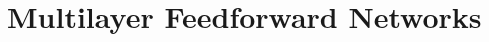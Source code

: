 \documentclass[../main.tex]{subfiles}
\begin{document}
	\chapter{Multilayer Feedforward Networks} \label{ch:machine}
	
	
	
\end{document}
